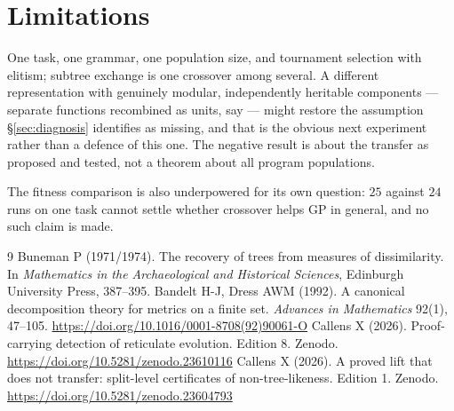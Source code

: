 \documentclass[11pt,a4paper]{article}
\theoremstyle{definition}
\theoremstyle{remark}
\begin{document}
\section{Limitations}

One task, one grammar, one population size, and tournament selection with
elitism; subtree exchange is one crossover among several. A different
representation with genuinely modular, independently heritable components ---
separate functions recombined as units, say --- might restore the assumption
\S\ref{sec:diagnosis} identifies as missing, and that is the obvious next
experiment rather than a defence of this one. The negative result is about the
transfer as proposed and tested, not a theorem about all program populations.

The fitness comparison is also underpowered for its own question: $25$ against
$24$ runs on one task cannot settle whether crossover helps GP in general, and no
such claim is made.

\begin{thebibliography}{9}
 Buneman P (1971/1974). The recovery of trees from measures of
dissimilarity. In \emph{Mathematics in the Archaeological and Historical
Sciences}, Edinburgh University Press, 387--395.
 Bandelt H-J, Dress AWM (1992). A canonical decomposition
theory for metrics on a finite set. \emph{Advances in Mathematics} 92(1),
47--105. \url{https://doi.org/10.1016/0001-8708(92)90061-O}
 Callens X (2026). Proof-carrying detection of reticulate
evolution. Edition 8. Zenodo. \url{https://doi.org/10.5281/zenodo.23610116}
 Callens X (2026). A proved lift that does not transfer:
split-level certificates of non-tree-likeness. Edition 1. Zenodo.
\url{https://doi.org/10.5281/zenodo.23604793}
\end{thebibliography}
\end{document}
